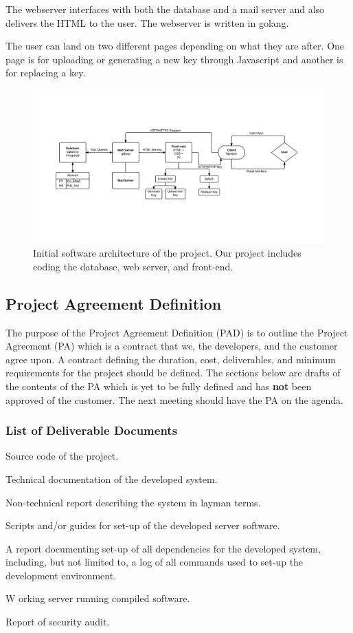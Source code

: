 \documentclass[11pt,a4paper]{report}
\let\OldItem\item
\newcommand{\SubItemStart}[1]{%
    \let\item\SubItemEnd
    \begin{SubItemList}[resume]%
        \OldItem #1%
}
\newcommand{\SubItemMiddle}[1]{%
    \OldItem #1%
}
\newcommand{\SubItemEnd}[1]{%
    \end{SubItemList}%
    \let\item\OldItem
    \item #1%
}
\newcommand*{\SubItem}[1]{%
    \let\SubItem\SubItemMiddle%
    \SubItemStart{#1}%
}%
\begin{document}
The webserver interfaces with both the database and a mail server and also delivers the HTML to the user. The webserver is written in golang.

The user can land on two different pages depending on what they are after. One page is for uploading or generating a new key through Javascript and another is for replacing a key.

\begin{figure}[h!]
\centering
\includegraphics[width=1.1\textwidth]{pictures/pksu_isa_centered}
\caption{Initial software architecture of the project. Our project includes coding the database, web server, and front-end.}
\label{fig:ISA}
\end{figure}

\subsection{Project Agreement Definition}
The purpose of the Project Agreement Definition (PAD) is to outline the Project Agreement (PA) which is a contract that we, the developers, and the customer agree upon. A contract defining the duration, cost, deliverables, and minimum requirements for the project should be defined. The sections below are drafts of the contents of the PA which is yet to be fully defined and has \textbf{not} been approved of the customer. The next meeting should have the PA on the agenda.
\subsubsection{List of Deliverable Documents}\label{sec:deliverables}
\begin{itemize}
\item Source code of the project.
\item Technical documentation of the developed system.
\item Non-technical report describing the system in layman terms.
\item Scripts and/or guides for set-up of the developed server software.
\SubItem A report documenting set-up of all dependencies for the developed system, including, but not limited to, a log of all commands used to set-up the development environment.
\item Working server running compiled software.
\item Report of security audit.
\end{itemize}
\end{document}
